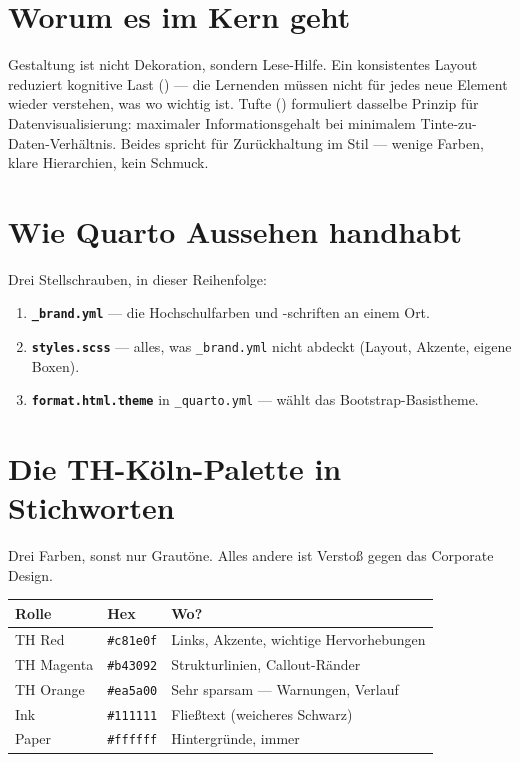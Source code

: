 \documentclass[
  ngerman,
  a4paper,
  DIV=11]{scrreprt}
\providecommand{\tightlist}{%
  \setlength{\itemsep}{0pt}\setlength{\parskip}{0pt}}
\begin{document}
\section{Worum es im Kern geht}\label{worum-es-im-kern-geht-2}

Gestaltung ist nicht Dekoration, sondern Lese-Hilfe. Ein konsistentes
Layout reduziert kognitive Last ()
--- die Lernenden müssen nicht für jedes neue Element wieder verstehen,
was wo wichtig ist. Tufte () formuliert
dasselbe Prinzip für Datenvisualisierung: maximaler Informationsgehalt
bei minimalem Tinte-zu-Daten-Verhältnis. Beides spricht für
Zurückhaltung im Stil --- wenige Farben, klare Hierarchien, kein
Schmuck.

\section{Wie Quarto Aussehen
handhabt}\label{wie-quarto-aussehen-handhabt}

Drei Stellschrauben, in dieser Reihenfolge:

\begin{enumerate}
\def\labelenumi{\arabic{enumi}.}
\tightlist
\item
  \textbf{\texttt{\_brand.yml}} --- die Hochschulfarben und -schriften
  an einem Ort.
\item
  \textbf{\texttt{styles.scss}} --- alles, was \texttt{\_brand.yml}
  nicht abdeckt (Layout, Akzente, eigene Boxen).
\item
  \textbf{\texttt{format.html.theme}} in \texttt{\_quarto.yml} --- wählt
  das Bootstrap-Basistheme.
\end{enumerate}

\section{Die TH-Köln-Palette in
Stichworten}\label{die-th-kuxf6ln-palette-in-stichworten}

Drei Farben, sonst nur Grautöne. Alles andere ist Verstoß gegen das
Corporate Design.

\begin{longtable}[]{@{}lll@{}}
\toprule\noalign{}
Rolle & Hex & Wo? \\
\midrule\noalign{}
\endhead
\bottomrule\noalign{}
\endlastfoot
TH Red & \texttt{\#c81e0f} & Links, Akzente, wichtige Hervorhebungen \\
TH Magenta & \texttt{\#b43092} & Strukturlinien, Callout-Ränder \\
TH Orange & \texttt{\#ea5a00} & Sehr sparsam --- Warnungen, Verlauf \\
Ink & \texttt{\#111111} & Fließtext (weicheres Schwarz) \\
Paper & \texttt{\#ffffff} & Hintergründe, immer \\
\end{longtable}
\end{document}
